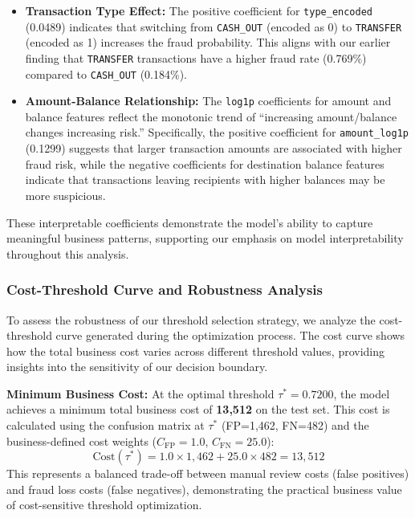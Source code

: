 \documentclass[sigplan,screen]{acmart}
\begin{document}
\begin{itemize}
\item \textbf{Transaction Type Effect:} The positive coefficient for \texttt{type\_encoded} (0.0489) indicates that switching from \texttt{CASH\_OUT} (encoded as 0) to \texttt{TRANSFER} (encoded as 1) increases the fraud probability. This aligns with our earlier finding that \texttt{TRANSFER} transactions have a higher fraud rate (0.769\%) compared to \texttt{CASH\_OUT} (0.184\%).

\item \textbf{Amount-Balance Relationship:} The \texttt{log1p} coefficients for amount and balance features reflect the monotonic trend of ``increasing amount/balance changes \textrightarrow{} increasing risk.'' Specifically, the positive coefficient for \texttt{amount\_log1p} (0.1299) suggests that larger transaction amounts are associated with higher fraud risk, while the negative coefficients for destination balance features indicate that transactions leaving recipients with higher balances may be more suspicious.
\end{itemize}

These interpretable coefficients demonstrate the model's ability to capture meaningful business patterns, supporting our emphasis on model interpretability throughout this analysis.

\subsubsection{Cost-Threshold Curve and Robustness Analysis}

To assess the robustness of our threshold selection strategy, we analyze the cost-threshold curve generated during the optimization process. The cost curve shows how the total business cost varies across different threshold values, providing insights into the sensitivity of our decision boundary.

\textbf{Minimum Business Cost:} At the optimal threshold $\tau^* = 0.7200$, the model achieves a minimum total business cost of \textbf{13,512} on the test set. This cost is calculated using the confusion matrix at $\tau^*$ (FP=1,462, FN=482) and the business-defined cost weights ($C_{\text{FP}}=1.0$, $C_{\text{FN}}=25.0$):
\begin{equation*}
\text{Cost}(\tau^*) = 1.0 \times 1{,}462 + 25.0 \times 482 = 13{,}512
\end{equation*}
This represents a balanced trade-off between manual review costs (false positives) and fraud loss costs (false negatives), demonstrating the practical business value of cost-sensitive threshold optimization.
\end{document}
